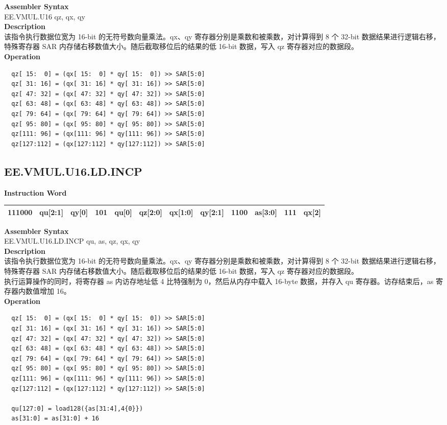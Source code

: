 \textbf{Assembler Syntax} \\
EE.VMUL.U16 qz, qx, qy \\
\textbf{Description} \\
该指令执行数据位宽为 16-bit 的无符号数向量乘法。qx、qy 寄存器分别是乘数和被乘数，对计算得到 8 个 32-bit 数据结果进行逻辑右移，特殊寄存器 SAR 内存储右移数值大小。随后截取移位后的结果的低 16-bit 数据，写入 qz 寄存器对应的数据段。\\
\textbf{Operation}
\begin{lstlisting}
  qz[ 15:  0] = (qx[ 15:  0] * qy[ 15:  0]) >> SAR[5:0]
  qz[ 31: 16] = (qx[ 31: 16] * qy[ 31: 16]) >> SAR[5:0]
  qz[ 47: 32] = (qx[ 47: 32] * qy[ 47: 32]) >> SAR[5:0]
  qz[ 63: 48] = (qx[ 63: 48] * qy[ 63: 48]) >> SAR[5:0]
  qz[ 79: 64] = (qx[ 79: 64] * qy[ 79: 64]) >> SAR[5:0]
  qz[ 95: 80] = (qx[ 95: 80] * qy[ 95: 80]) >> SAR[5:0]
  qz[111: 96] = (qx[111: 96] * qy[111: 96]) >> SAR[5:0]
  qz[127:112] = (qx[127:112] * qy[127:112]) >> SAR[5:0]
\end{lstlisting}

\clearpage
\subsection{EE.VMUL.U16.LD.INCP}\label{instruction:EEVMULU16LDINCP}
\setlength\tabcolsep{6pt}
\textbf{Instruction Word} \\
\begin{tabular}{|c|c|c|c|c|c|c|c|c|c|c|c|}
	\hline
	111000 & qu[2:1] & qy[0] & 101 & qu[0] & qz[2:0] & qx[1:0] & qy[2:1] & 1100 & as[3:0] & 111 & qx[2] \\
	\hline
\end{tabular}

\textbf{Assembler Syntax} \\
EE.VMUL.U16.LD.INCP qu, as, qz, qx, qy \\
\textbf{Description} \\
该指令执行数据位宽为 16-bit 的无符号数向量乘法。qx、qy 寄存器分别是乘数和被乘数，对计算得到 8 个 32-bit 数据结果进行逻辑右移，特殊寄存器 SAR 内存储右移数值大小。随后截取移位后的结果的低 16-bit 数据，写入 qz 寄存器对应的数据段。\\ 执行运算操作的同时，将寄存器 as 内访存地址低 4 比特强制为 0，然后从内存中载入 16-byte 数据，并存入 qu 寄存器。访存结束后，as 寄存器内数值增加 16。\\
\textbf{Operation}
\begin{lstlisting}
  qz[ 15:  0] = (qx[ 15:  0] * qy[ 15:  0]) >> SAR[5:0]
  qz[ 31: 16] = (qx[ 31: 16] * qy[ 31: 16]) >> SAR[5:0]
  qz[ 47: 32] = (qx[ 47: 32] * qy[ 47: 32]) >> SAR[5:0]
  qz[ 63: 48] = (qx[ 63: 48] * qy[ 63: 48]) >> SAR[5:0]
  qz[ 79: 64] = (qx[ 79: 64] * qy[ 79: 64]) >> SAR[5:0]
  qz[ 95: 80] = (qx[ 95: 80] * qy[ 95: 80]) >> SAR[5:0]
  qz[111: 96] = (qx[111: 96] * qy[111: 96]) >> SAR[5:0]
  qz[127:112] = (qx[127:112] * qy[127:112]) >> SAR[5:0]

  qu[127:0] = load128({as[31:4],4{0}})
  as[31:0] = as[31:0] + 16
\end{lstlisting}

